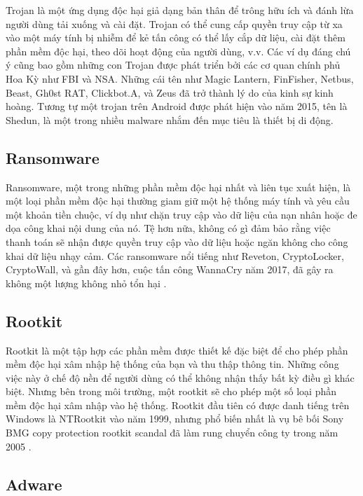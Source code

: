 Trojan là một ứng dụng độc hại giả dạng bản thân để trông hữu ích và đánh lừa người dùng tải xuống và cài đặt. Trojan có thể cung cấp quyền truy cập từ xa vào một máy tính bị nhiễm để kẻ tấn công có thể lấy cắp dữ liệu, cài đặt thêm phần mềm độc hại, theo dõi hoạt động của người dùng, v.v. Các ví dụ đáng chú ý cũng bao gồm những con Trojan được phát triển bởi các cơ quan chính phủ Hoa Kỳ như FBI và NSA. Những cái tên như Magic Lantern, FinFisher, Netbus, Beast, Gh0st RAT, Clickbot.A, và Zeus đã trở thành lý do của kinh sự kinh hoàng. Tương tự  một trojan trên Android được phát hiện vào năm 2015, tên là Shedun, là một trong nhiều malware nhắm đến mục tiêu là thiết bị di động.

\subsection{Ransomware}

Ransomware, một trong những phần mềm độc hại nhất và liên tục xuất hiện, là một loại phần mềm độc hại thường giam giữ một hệ thống máy tính và yêu cầu một khoản tiền chuộc, ví dụ như chặn truy cập vào dữ liệu của nạn nhân hoặc đe dọa công khai nội dung của nó. Tệ hơn nữa, không có gì đảm bảo rằng việc thanh toán sẽ nhận được quyền truy cập vào dữ liệu hoặc ngăn không cho công khai dữ liệu nhạy cảm. Các ransomware nổi tiếng như Reveton, CryptoLocker, CryptoWall, và gần đây hơn, cuộc tấn công WannaCry năm 2017, đã gây ra không một lượng không nhỏ tổn hại \cite{chen2017automated}.

\subsection{Rootkit}

Rootkit là một tập hợp các phần mềm được thiết kế đặc biệt để cho phép phần mềm độc hại xâm nhập hệ thống của bạn và thu thập thông tin. Những công việc này ở chế độ nền để người dùng có thể không nhận thấy bất kỳ điều gì khác biệt. Nhưng bên trong môi trường, một rootkit sẽ cho phép một số loại phần mềm độc hại xâm nhập vào hệ thống. Rootkit đầu tiên có được danh tiếng trên Windows là NTRootkit vào năm 1999, nhưng phổ biến nhất là vụ bê bối Sony BMG copy protection rootkit scandal đã làm rung chuyển công ty trong năm 2005 \cite{bruce2005sony}.

\subsection{Adware}

